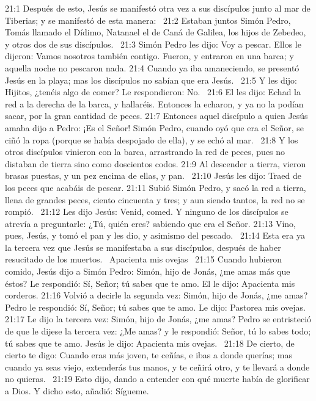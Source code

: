 21:1 Después de esto, Jesús se manifestó otra vez a sus discípulos junto al mar de Tiberias; y se manifestó de esta manera:  
21:2 Estaban juntos Simón Pedro, Tomás llamado el Dídimo, Natanael el de Caná de Galilea, los hijos de Zebedeo, y otros dos de sus discípulos.  
21:3 Simón Pedro les dijo: Voy a pescar. Ellos le dijeron: Vamos nosotros también contigo. Fueron, y entraron en una barca; y aquella noche no pescaron nada. 
21:4 Cuando ya iba amaneciendo, se presentó Jesús en la playa; mas los discípulos no sabían que era Jesús.  
21:5 Y les dijo: Hijitos, ¿tenéis algo de comer? Le respondieron: No.  
21:6 El les dijo: Echad la red a la derecha de la barca, y hallaréis. Entonces la echaron, y ya no la podían sacar, por la gran cantidad de peces. 
21:7 Entonces aquel discípulo a quien Jesús amaba dijo a Pedro: ¡Es el Señor! Simón Pedro, cuando oyó que era el Señor, se ciñó la ropa (porque se había despojado de ella), y se echó al mar.  
21:8 Y los otros discípulos vinieron con la barca, arrastrando la red de peces, pues no distaban de tierra sino como doscientos codos. 
21:9 Al descender a tierra, vieron brasas puestas, y un pez encima de ellas, y pan.  
21:10 Jesús les dijo: Traed de los peces que acabáis de pescar. 
21:11 Subió Simón Pedro, y sacó la red a tierra, llena de grandes peces, ciento cincuenta y tres; y aun siendo tantos, la red no se rompió.  
21:12 Les dijo Jesús: Venid, comed. Y ninguno de los discípulos se atrevía a preguntarle: ¿Tú, quién eres? sabiendo que era el Señor. 
21:13 Vino, pues, Jesús, y tomó el pan y les dio, y asimismo del pescado.  
21:14 Esta era ya la tercera vez que Jesús se manifestaba a sus discípulos, después de haber resucitado de los muertos.  
Apacienta mis ovejas  
21:15 Cuando hubieron comido, Jesús dijo a Simón Pedro: Simón, hijo de Jonás, ¿me amas más que éstos? Le respondió: Sí, Señor; tú sabes que te amo. El le dijo: Apacienta mis corderos. 
21:16 Volvió a decirle la segunda vez: Simón, hijo de Jonás, ¿me amas? Pedro le respondió: Sí, Señor; tú sabes que te amo. Le dijo: Pastorea mis ovejas. 
21:17 Le dijo la tercera vez: Simón, hijo de Jonás, ¿me amas? Pedro se entristeció de que le dijese la tercera vez: ¿Me amas? y le respondió: Señor, tú lo sabes todo; tú sabes que te amo. Jesús le dijo: Apacienta mis ovejas.  
21:18 De cierto, de cierto te digo: Cuando eras más joven, te ceñías, e ibas a donde querías; mas cuando ya seas viejo, extenderás tus manos, y te ceñirá otro, y te llevará a donde no quieras.  
21:19 Esto dijo, dando a entender con qué muerte había de glorificar a Dios. Y dicho esto, añadió: Sígueme.  
